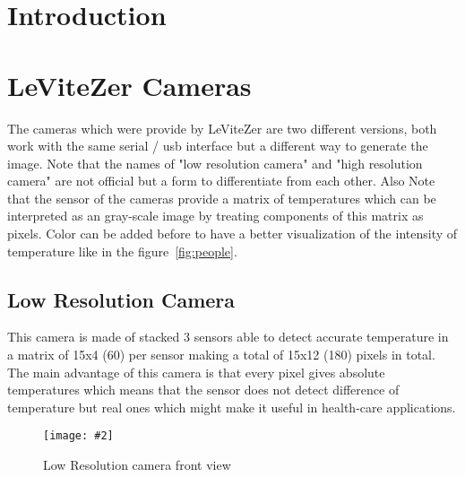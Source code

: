 \documentclass[hidelinks,11pt,a4paper,oneside,article]{memoir}
\newcommand{\putimage}[3][10] %
{
\begin{figure}[h]
    \centering
    \captionsetup{justification=centering}
    \texttt{[image: \#2]}
    \caption{#3}
    \label{fig:#2}
\end{figure}
}
\begin{document}
\setcounter{page}{1} %
\ClearWallPaper

\sloppy %

\chapter{Introduction}


\clearpage	
\chapter{LeViteZer Cameras}\label{sec:theoretical-background}

The cameras which were provide by LeViteZer are two different versions, both work with the same serial / \gls{usb} interface but a different way to generate the image. Note that the names of "low resolution camera" and "high resolution camera" are not official but a form to differentiate from each other. Also Note that the sensor of the cameras provide a matrix of temperatures which can be interpreted as an gray-scale image by treating components of this matrix as pixels. Color can be added before to have a better visualization of the intensity of temperature like in the figure~\ref{fig:people}.

\section{Low Resolution Camera}
This camera is made of stacked 3 sensors able to detect accurate temperature in a matrix of 15x4 (60) per sensor making a total of 15x12 (180) pixels in total. The main advantage of this camera is that every pixel gives absolute temperatures which means that the sensor does not detect difference of temperature but real ones which might make it useful in health-care applications.

    \putimage{low-resolution}{Low Resolution camera front view}
\end{document}
